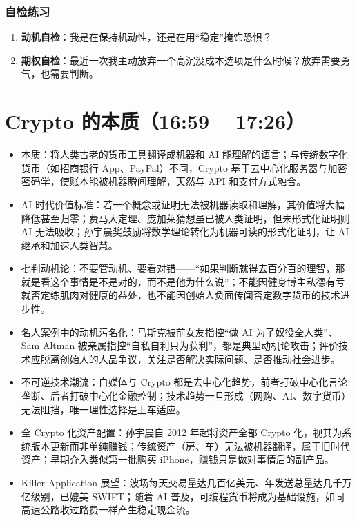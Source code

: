\subsubsection{自检练习}

\begin{enumerate}
\def\labelenumi{\arabic{enumi}.}
\tightlist
\item
  \textbf{动机自检}：我是在保持机动性，还是在用``稳定''掩饰恐惧？
\item
  \textbf{期权自检}：最近一次我主动放弃一个高沉没成本选项是什么时候？放弃需要勇气，也需要判断。
\end{enumerate}

\section{Crypto 的本质（16:59 --
17:26）}

\begin{itemize}
\tightlist
\item
  本质：将人类古老的货币工具翻译成机器和 AI
  能理解的语言；与传统数字化货币（如招商银行 App、PayPal）不同，Crypto
  基于去中心化服务器与加密密码学，使账本能被机器瞬间理解，天然与 API
  和支付方式融合。
\item
  AI
  时代价值标准：若一个概念或证明无法被机器读取和理解，其价值将大幅降低甚至归零；费马大定理、庞加莱猜想虽已被人类证明，但未形式化证明则
  AI 无法吸收；孙宇晨奖鼓励将数学理论转化为机器可读的形式化证明，让 AI
  继承和加速人类智慧。
\item
  批判动机论：不要管动机、要看对错------``如果判断就得去百分百的理智，那就是看这个事情是不是对的，而不是他为什么说''；不能因健身博主私德有亏就否定练肌肉对健康的益处，也不能因创始人负面传闻否定数字货币的技术进步性。
\item
  名人案例中的动机污名化：马斯克被前女友指控``做 AI
  为了奴役全人类''、Sam Altman
  被亲属指控``自私自利只为获利''，都是典型动机论攻击；评价技术应脱离创始人的人品争议，关注是否解决实际问题、是否推动社会进步。
\item
  不可逆技术潮流：自媒体与 Crypto
  都是去中心化趋势，前者打破中心化言论垄断、后者打破中心化金融控制；技术趋势一旦形成（网购、AI、数字货币）无法阻挡，唯一理性选择是上车适应。
\item
  全 Crypto 化资产配置：孙宇晨自 2012 年起将资产全部 Crypto
  化，视其为系统版本更新而非单纯赚钱；传统资产（房、车）无法被机器翻译，属于旧时代资产；早期介入类似第一批购买
  iPhone，赚钱只是做对事情后的副产品。
\item
  Killer Application
  展望：波场每天交易量达几百亿美元、年发送总量达几千万亿级别，已媲美
  SWIFT；随着 AI
  普及，可编程货币将成为基础设施，如同高速公路收过路费一样产生稳定现金流。
\end{itemize}


